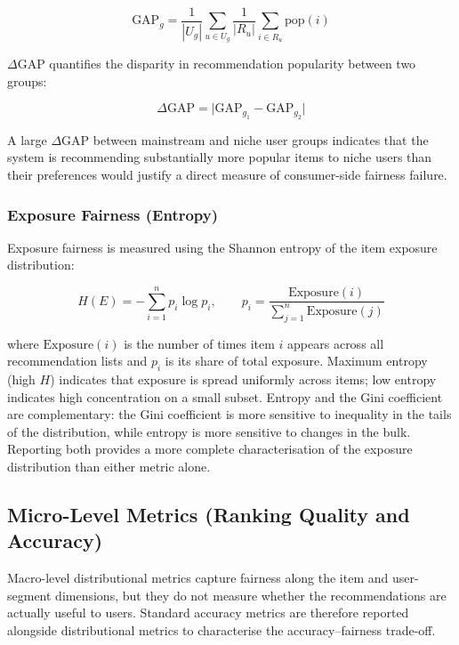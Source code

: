 \documentclass[11pt,a4paper]{report}
\begin{document}
\begin{equation}
\textrm{GAP}_g = \frac{1}{|U_g|}\sum_{u \in U_g}\frac{1}{|R_u|}\sum_{i \in R_u}\textrm{pop}(i)
\end{equation}

$\Delta$GAP quantifies the disparity in recommendation popularity between two groups:

\begin{equation}
\Delta\textrm{GAP} = \bigl|\textrm{GAP}_{g_1} - \textrm{GAP}_{g_2}\bigr|
\end{equation}

A large $\Delta$GAP between mainstream and niche user groups indicates that the system is recommending substantially more popular items to niche users than their preferences would justify a direct measure of consumer-side fairness failure.

\subsubsection*{Exposure Fairness (Entropy)}

Exposure fairness is measured using the Shannon entropy of the item exposure distribution:

\begin{equation}
H(E) = -\sum_{i=1}^{n} p_i \log p_i, \qquad p_i = \frac{\textrm{Exposure}(i)}{\sum_{j=1}^{n}\textrm{Exposure}(j)}
\end{equation}

where $\textrm{Exposure}(i)$ is the number of times item $i$ appears across all recommendation lists and $p_i$ is its share of total exposure. Maximum entropy (high $H$) indicates that exposure is spread uniformly across items; low entropy indicates high concentration on a small subset. Entropy and the Gini coefficient are complementary: the Gini coefficient is more sensitive to inequality in the tails of the distribution, while entropy is more sensitive to changes in the bulk. Reporting both provides a more complete characterisation of the exposure distribution than either metric alone.

\subsection{Micro-Level Metrics (Ranking Quality and Accuracy)}
\label{sec:method_metrics_micro}

Macro-level distributional metrics capture fairness along the item and user-segment dimensions, but they do not measure whether the recommendations are actually useful to users. Standard accuracy metrics are therefore reported alongside distributional metrics to characterise the accuracy--fairness trade-off.
\end{document}
